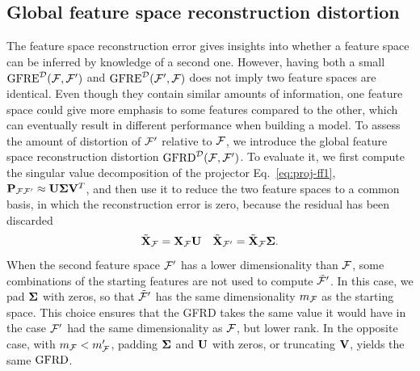\subsection{Global feature space reconstruction distortion}

The feature space reconstruction error gives insights into whether a feature space can be inferred by knowledge of a second one. However, having both a small $\operatorname{GFRE}^{\mathcal{D}}(\mathcal{F},\mathcal{F}^{\prime})$ and $\operatorname{GFRE}^{\mathcal{D}}(\mathcal{F}^{\prime},\mathcal{F})$ does not imply two feature spaces are identical. Even though they contain similar amounts of information, one feature space could give more emphasis to some features compared to the other, which can eventually result in different performance when building a model.
To assess the amount of distortion of $\mathcal{F}^{\prime}$ relative to $\mathcal{F}$, we introduce the global feature space reconstruction distortion $\operatorname{GFRD}^{\mathcal{D}}(\mathcal{F},\mathcal{F}^{\prime})$.
To evaluate it, we first compute the singular value decomposition of the projector Eq.~\eqref{eq:proj-ff1}, $\mathbf{P}_{{\mathcal{F}}{\mathcal{F}^{\prime}}}\approx\mathbf{U} \boldsymbol{\Sigma} \mathbf{V}^T$, and then use it to reduce the two feature spaces to a common basis, in which the reconstruction error is zero, because the residual has been discarded
\begin{equation}
{\tilde{\mathbf{X}}}_{\mathcal{F}} = \mathbf{X}_{\mathcal{F}}\mathbf{U} \quad  {\tilde{\mathbf{X}}}_{\mathcal{F}^{\prime}} = {\tilde{\mathbf{X}}}_{\mathcal{F}} \boldsymbol{\Sigma}.
\end{equation}
When the second feature space $\mathcal{F}^{\prime}$ has a lower dimensionality than $\mathcal{F}$, some combinations of the starting features are not used to compute $\tilde{\mathcal{F}}^{\prime}$. 
In this case, we pad $\boldsymbol{\Sigma}$ with zeros, so that $\tilde{\mathcal{F}}^{\prime}$ has the same dimensionality $m_{\mathcal{F}}$ as the starting space. This choice ensures that the GFRD takes the same value it would have in the case $\mathcal{F}^{\prime}$ had the same dimensionality as $\mathcal{F}$, but lower rank. 
In the opposite case, with $m_{\mathcal{F}}<m_{\mathcal{F}}^{\prime}$, padding $\boldsymbol{\Sigma}$ and $\mathbf{U}$ with zeros, or truncating $\mathbf{V}$, yields the same $\operatorname{GFRD}$.


